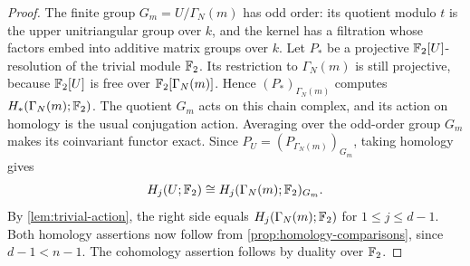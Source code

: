 \begin{proof}
The finite group $G_m=U/\Gamma_N(m)$ has odd order: its quotient modulo
$t$ is the upper unitriangular group over $k$, and the kernel has a
filtration whose factors embed into additive matrix groups over $k$.
Let $P_*$ be a projective $\mathbb F_2[U]$-resolution of the trivial module $\mathbb F_2$.
Its restriction to $\Gamma_N(m)$ is still projective, because $\mathbb F_2[U]$
is free over $\mathbb F_2[\Gamma_N(m)]$. Hence
$(P_*)_{\Gamma_N(m)}$ computes $H_*(\Gamma_N(m);\mathbb F_2)$.
The quotient $G_m$ acts on this chain complex, and its action on homology
is the usual conjugation action. Averaging over the odd-order group
$G_m$ makes its coinvariant functor exact. Since
$P_U=(P_{\Gamma_N(m)})_{G_m}$, taking homology gives
\[
 H_j(U;\mathbb F_2)\cong H_j(\Gamma_N(m);\mathbb F_2)_{G_m}.
\]
By \cref{lem:trivial-action}, the right side equals
$H_j(\Gamma_N(m);\mathbb F_2)$ for $1\le j\le d-1$.
Both homology assertions now follow from
\cref{prop:homology-comparisons}, since $d-1<n-1$.
The cohomology assertion follows by duality over $\mathbb F_2$.
\end{proof}

